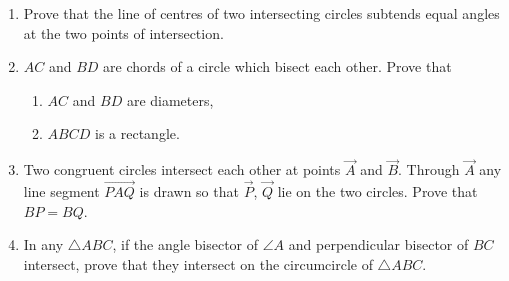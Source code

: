 \begin{enumerate}[label=\thesection.\arabic*,ref=\thesection.\theenumi]
\item Prove that the line of centres of two intersecting circles subtends equal angles at the two points of intersection.
\\
    \solution 
\label{chapters/9/10/6/1}

\item  $AC$ and $BD$ are chords of a circle which bisect each other. Prove that 
	\begin{enumerate}
		\item  $AC$ and $BD$ are diameters, 
		\item  $ABCD$ is a rectangle.
	\end{enumerate}
    \solution 
\label{chapters/9/10/6/7}

\item Two congruent circles intersect each other at points $\vec{A}$ and $\vec{B}$. Through $\vec{A}$ any line segment $\vec{PAQ}$ is drawn so that $\vec{P}$, $\vec{Q}$ lie on the two circles. Prove that $BP = BQ$.
\label{chapters/9/10/6/9}
\\
    \solution 

\item In any $\triangle ABC$, if the angle bisector of $\angle A$ and 
    perpendicular bisector of $BC$ intersect, prove that they intersect on 
    the circumcircle of $\triangle ABC$.
\\
    \solution 
\label{chapters/9/10/6/10}


\end{enumerate}
